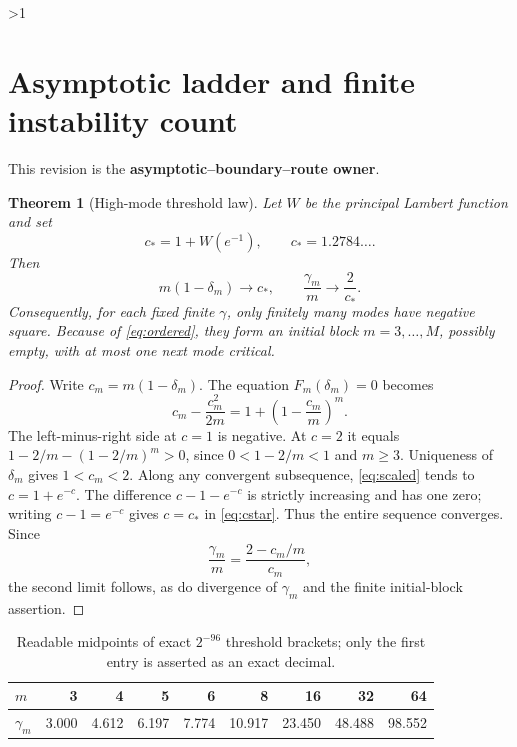 \documentclass[10pt]{article}
\providecommand{\CRevisionRound}{2}
\newtheorem{theorem}{Theorem}
\begin{document}
\ifnum\CRevisionRound>1
\section{Asymptotic ladder and finite instability count}
This revision is the \textbf{asymptotic--boundary--route owner}.

\begin{theorem}[High-mode threshold law]\label{thm:asymptotic}
Let $W$ be the principal Lambert function and set
\begin{equation}\label{eq:cstar}
 c_*=1+W(e^{-1}),\qquad c_*=1.2784\ldots.
\end{equation}
Then
\begin{equation}\label{eq:asymptotic}
 m(1-\delta_m)\longrightarrow c_*,
 \qquad \frac{\gamma_m}{m}\longrightarrow\frac{2}{c_*}.
\end{equation}
Consequently, for each fixed finite $\gamma$, only finitely many modes have
negative square.  Because of \eqref{eq:ordered}, they form an initial block
$m=3,\ldots,M$, possibly empty, with at most one next mode critical.
\end{theorem}

\begin{proof}
Write $c_m=m(1-\delta_m)$.  The equation $F_m(\delta_m)=0$ becomes
\begin{equation}\label{eq:scaled}
 c_m-\frac{c_m^2}{2m}=1+\left(1-\frac{c_m}{m}\right)^m.
\end{equation}
The left-minus-right side at $c=1$ is negative.  At $c=2$ it equals
$1-2/m-(1-2/m)^m>0$, since $0<1-2/m<1$ and $m\ge3$.
Uniqueness of $\delta_m$ gives $1<c_m<2$.  Along any convergent subsequence,
\eqref{eq:scaled} tends to $c=1+e^{-c}$.  The difference
$c-1-e^{-c}$ is strictly increasing and has one zero; writing
$c-1=e^{-c}$ gives $c=c_*$ in \eqref{eq:cstar}.  Thus the entire sequence
converges.  Since
\[
 \frac{\gamma_m}{m}=\frac{2-c_m/m}{c_m},
\]
the second limit follows, as do divergence of $\gamma_m$ and the finite
initial-block assertion.
\end{proof}

\begin{table}[H]
\centering\small
\begin{tabular}{@{}lrrrrrrrr@{}}
\toprule
$m$ & 3 & 4 & 5 & 6 & 8 & 16 & 32 & 64\\
\midrule
$\gamma_m$ & 3.000 & 4.612 & 6.197 & 7.774 & 10.917 & 23.450 & 48.488 & 98.552\\
\bottomrule
\end{tabular}
\caption{Readable midpoints of exact $2^{-96}$ threshold brackets; only the
first entry is asserted as an exact decimal.}
\label{tab:thresholds}
\end{table}
\end{document}
